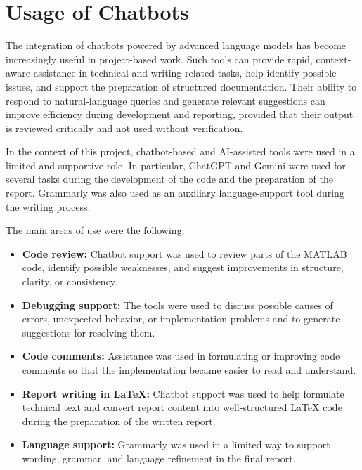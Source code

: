 \chapter{Usage of Chatbots}
\label{chap:tools_ai_usage}

The integration of chatbots powered by advanced language models has become increasingly useful in project-based work. Such tools can provide rapid, context-aware assistance in technical and writing-related tasks, help identify possible issues, and support the preparation of structured documentation. Their ability to respond to natural-language queries and generate relevant suggestions can improve efficiency during development and reporting, provided that their output is reviewed critically and not used without verification.

In the context of this project, chatbot-based and AI-assisted tools were used in a limited and supportive role. In particular, ChatGPT and Gemini were used for several tasks during the development of the code and the preparation of the report. Grammarly was also used as an auxiliary language-support tool during the writing process.

The main areas of use were the following:
\begin{itemize}
    \item \textbf{Code review:} Chatbot support was used to review parts of the MATLAB code, identify possible weaknesses, and suggest improvements in structure, clarity, or consistency.

    \item \textbf{Debugging support:} The tools were used to discuss possible causes of errors, unexpected behavior, or implementation problems and to generate suggestions for resolving them.

    \item \textbf{Code comments:} Assistance was used in formulating or improving code comments so that the implementation became easier to read and understand.

    \item \textbf{Report writing in \LaTeX:} Chatbot support was used to help formulate technical text and convert report content into well-structured \LaTeX{} code during the preparation of the written report.

    \item \textbf{Language support:} Grammarly was used in a limited way to support wording, grammar, and language refinement in the final report.
\end{itemize}

